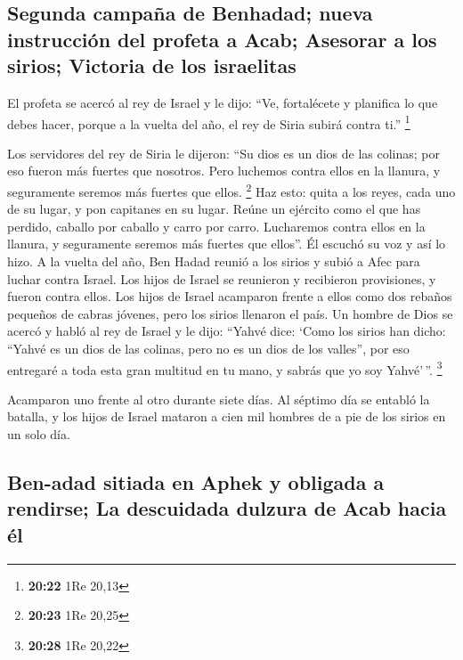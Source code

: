 \begin{paracol}{2}
{\subsection{Segunda campaña de Benhadad; nueva instrucción del profeta a
Acab; Asesorar a los sirios; Victoria de los
israelitas}\label{segunda-campauxf1a-de-benhadad-nueva-instrucciuxf3n-del-profeta-a-acab-asesorar-a-los-sirios-victoria-de-los-israelitas}}

 El profeta se acercó al rey de Israel y le dijo: ``Ve,
fortalécete y planifica lo que debes hacer, porque a la vuelta del año,
el rey de Siria subirá contra ti.'' \footnote{\textbf{20:22} 1Re 20,13}

 Los servidores del rey de Siria le dijeron: ``Su dios es
un dios de las colinas; por eso fueron más fuertes que nosotros. Pero
luchemos contra ellos en la llanura, y seguramente seremos más fuertes
que ellos. \footnote{\textbf{20:23} 1Re 20,25}  Haz esto:
quita a los reyes, cada uno de su lugar, y pon capitanes en su lugar.
 Reúne un ejército como el que has perdido, caballo por
caballo y carro por carro. Lucharemos contra ellos en la llanura, y
seguramente seremos más fuertes que ellos''. Él escuchó su voz y así lo
hizo.  A la vuelta del año, Ben Hadad reunió a los sirios
y subió a Afec para luchar contra Israel.  Los hijos de
Israel se reunieron y recibieron provisiones, y fueron contra ellos. Los
hijos de Israel acamparon frente a ellos como dos rebaños pequeños de
cabras jóvenes, pero los sirios llenaron el país.  Un
hombre de Dios se acercó y habló al rey de Israel y le dijo: ``Yahvé
dice: `Como los sirios han dicho: ``Yahvé es un dios de las colinas,
pero no es un dios de los valles'', por eso entregaré a toda esta gran
multitud en tu mano, y sabrás que yo soy Yahvé'\,''. \footnote{\textbf{20:28}
  1Re 20,22}

 Acamparon uno frente al otro durante siete días. Al
séptimo día se entabló la batalla, y los hijos de Israel mataron a cien
mil hombres de a pie de los sirios en un solo día.

\hypertarget{ben-adad-sitiada-en-aphek-y-obligada-a-rendirse-la-descuidada-dulzura-de-acab-hacia-uxe9l}{%
\subsection{Ben-adad sitiada en Aphek y obligada a rendirse; La
descuidada dulzura de Acab hacia
él}\label{ben-adad-sitiada-en-aphek-y-obligada-a-rendirse-la-descuidada-dulzura-de-acab-hacia-uxe9l}}


\end{paracol}
